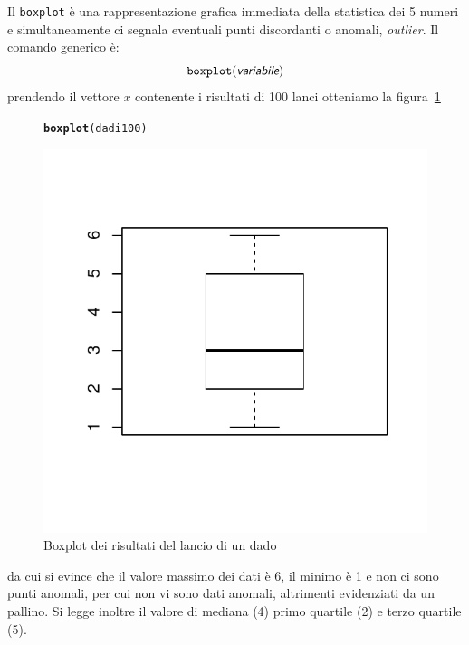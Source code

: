 \documentclass[onecolumn,12pt]{book}\usepackage[]{graphicx}\usepackage[]{color}
\makeatletter
\def\maxwidth{ %
  \ifdim\Gin@nat@width>\linewidth
    \linewidth
  \else
    \Gin@nat@width
  \fi
}
\newcommand{\hlstd}[1]{\textcolor[rgb]{0.345,0.345,0.345}{#1}}%
\newcommand{\hlkwd}[1]{\textcolor[rgb]{0.737,0.353,0.396}{\textbf{#1}}}%
\newenvironment{kframe}{%
 \def\at@end@of@kframe{}%
 \ifinner\ifhmode%
  \def\at@end@of@kframe{\end{minipage}}%
  \begin{minipage}{\columnwidth}%
 \fi\fi%
 \def\FrameCommand##1{\hskip\@totalleftmargin \hskip-\fboxsep
 \colorbox{shadecolor}{##1}\hskip-\fboxsep
     \hskip-\linewidth \hskip-\@totalleftmargin \hskip\columnwidth}%
 \MakeFramed {\advance\hsize-\width
   \@totalleftmargin\z@ \linewidth\hsize
   \@setminipage}}%
 {\par\unskip\endMakeFramed%
 \at@end@of@kframe}
\newenvironment{knitrout}{}{} %
\newcommand{\varia}[1]{\textsl{\textsf{#1}}}
\makeatother
\begin{document}
Il \texttt{boxplot}  \`e una rappresentazione grafica immediata della statistica dei 5 numeri e simultaneamente ci  segnala eventuali punti discordanti o anomali, {\it outlier}.
Il comando generico \`e: \begin{equation}\texttt{boxplot}(\varia{variabile})\end{equation}
prendendo il vettore $x$ contenente i risultati di 100 lanci
otteniamo la figura~\ref{fig:boxplotdado}
\begin{figure}[htbp]
\begin{center}
\begin{knitrout}
\color{fgcolor}\begin{kframe}
\begin{alltt}
\hlkwd{boxplot}\hlstd{(dadi100)}
\end{alltt}
\end{kframe}
\includegraphics[width=\maxwidth]{figure/unnamed-chunk-110-1} 

\end{knitrout}
\caption{Boxplot dei risultati del lancio di un dado}
\label{fig:boxplotdado}
\end{center}
\end{figure}
da cui si evince che il valore massimo dei dati \`e 6, il minimo \`e 1 e non ci sono punti anomali, per cui non vi sono dati anomali, altrimenti evidenziati da un pallino. Si legge inoltre il valore di mediana (4) primo quartile (2) e terzo quartile (5).
\end{document}
